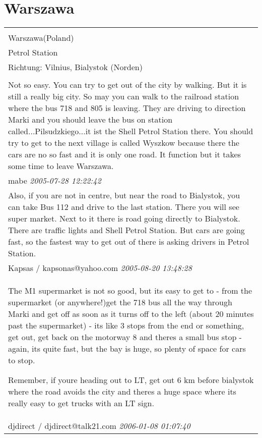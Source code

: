 \documentclass[a4paper,12pt]{article}
\begin{document}
\section{Warszawa}
\begin{tabular}{|p{13cm}|}
\hline\\
Warszawa(Poland)\\
Petrol Station\\
Richtung: Vilnius, Bialystok (Norden) \\
\hline\\
Not so easy. You can try to get out of the city by walking. But it is still a really big city. So may you can walk to the railroad station where the bus 718 and 805 is leaving. They are driving to direction Marki and you should leave the bus on station called...Pilsudzkiego...it ist the Shell Petrol Station there. You should try to get to the next village is called Wyszkow because there the cars are no so fast and it is only one road. It function but it takes some time to leave Warszawa. \\
mabe \textit{ 2005-07-28 12:22:42 }\\\hline Also, if you are not in centre, but near the road to Bialystok, you can take Bus 112 and drive to the last station. There you will see super market. Next to it there is road going directly to Bialystok. There are traffic lights and Shell Petrol Station. But cars are going fast, so the fastest way to get out of there is asking drivers in Petrol Station. \\
Kapsas / kapsonas@yahoo.com \textit{ 2005-08-20 13:48:28 }\\\hline The M1 supermarket is not so good, but its easy to get to - from the supermarket (or anywhere!)get the 718 bus all the way through Marki and get off as soon as it turns off to the left (about 20 minutes past the supermarket) - its like 3 stops from the end or something, get out, get back on the motorway 8 and theres a small bus stop - again, its quite fast, but the bay is huge, so plenty of space for cars to stop.

Remember, if youre heading out to LT, get out 6 km before bialystok where the road avoids the city and theres a huge space where its really easy to get trucks with an LT sign. \\
djdirect / djdirect@talk21.com \textit{ 2006-01-08 01:07:40 }\\\hline
\end{tabular}
\end{document}
